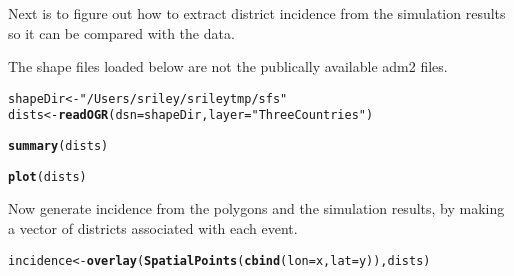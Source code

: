 \documentclass{article}\usepackage[]{graphicx}\usepackage[]{color}
\makeatletter
\newcommand{\hlstr}[1]{\textcolor[rgb]{0.192,0.494,0.8}{#1}}%
\newcommand{\hlstd}[1]{\textcolor[rgb]{0.345,0.345,0.345}{#1}}%
\newcommand{\hlkwb}[1]{\textcolor[rgb]{0.69,0.353,0.396}{#1}}%
\newcommand{\hlkwc}[1]{\textcolor[rgb]{0.333,0.667,0.333}{#1}}%
\newcommand{\hlkwd}[1]{\textcolor[rgb]{0.737,0.353,0.396}{\textbf{#1}}}%
\newenvironment{kframe}{%
 \def\at@end@of@kframe{}%
 \ifinner\ifhmode%
  \def\at@end@of@kframe{\end{minipage}}%
  \begin{minipage}{\columnwidth}%
 \fi\fi%
 \def\FrameCommand##1{\hskip\@totalleftmargin \hskip-\fboxsep
 \colorbox{shadecolor}{##1}\hskip-\fboxsep
     \hskip-\linewidth \hskip-\@totalleftmargin \hskip\columnwidth}%
 \MakeFramed {\advance\hsize-\width
   \@totalleftmargin\z@ \linewidth\hsize
   \@setminipage}}%
 {\par\unskip\endMakeFramed%
 \at@end@of@kframe}
\newenvironment{knitrout}{}{} %
\makeatother
\begin{document}
Next is to figure out how to extract district incidence from the simulation
results so it can be compared with the data.

The shape files loaded below are not the publically available adm2 files.

\begin{knitrout}
\color{fgcolor}\begin{kframe}
\begin{alltt}
\hlstd{shapeDir} \hlkwb{<-} \hlstr{"/Users/sriley/srileytmp/sfs"}
\hlstd{dists} \hlkwb{<-} \hlkwd{readOGR}\hlstd{(}\hlkwc{dsn}\hlstd{=shapeDir,}\hlkwc{layer}\hlstd{=}\hlstr{"ThreeCountries"}\hlstd{)}
\end{alltt}


{\ttfamily\noindent\bfseries\color{errorcolor}{\#\# Error in ogrInfo(dsn = dsn, layer = layer, encoding = encoding, use\_iconv = use\_iconv, : Cannot open data source}}\begin{alltt}
\hlkwd{summary}\hlstd{(dists)}
\end{alltt}


{\ttfamily\noindent\bfseries\color{errorcolor}{\#\# Error in summary(dists): object 'dists' not found}}\begin{alltt}
\hlkwd{plot}\hlstd{(dists)}
\end{alltt}


{\ttfamily\noindent\bfseries\color{errorcolor}{\#\# Error in plot(dists): object 'dists' not found}}\end{kframe}
\end{knitrout}

Now generate incidence from the polygons and the simulation results, by making a
vector of districts associated with each event.

\begin{knitrout}
\color{fgcolor}\begin{kframe}
\begin{alltt}
\hlstd{incidence} \hlkwb{<-} \hlkwd{overlay}\hlstd{(}\hlkwd{SpatialPoints}\hlstd{(}\hlkwd{cbind}\hlstd{(}\hlkwc{lon}\hlstd{=x,}\hlkwc{lat}\hlstd{=y)),dists)}
\end{alltt}


{\ttfamily\noindent\bfseries\color{errorcolor}{\#\# Error in cbind(lon = x, lat = y): object 'x' not found}}\end{kframe}
\end{knitrout}
\end{document}
